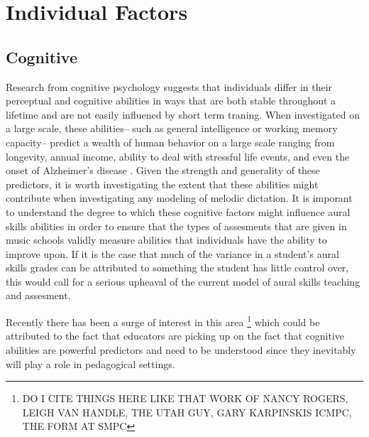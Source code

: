 \documentclass[]{book}
\let\rmarkdownfootnote\footnote%
\def\footnote{\protect\rmarkdownfootnote}
\theoremstyle{definition}
\theoremstyle{definition}
\theoremstyle{definition}
\theoremstyle{remark}
\begin{document}
\hypertarget{individual-factors}{%
\section{Individual Factors}\label{individual-factors}}

\hypertarget{cognitive}{%
\subsection{Cognitive}\label{cognitive}}

Research from cognitive psychology suggests that individuals differ in
their perceptual and cognitive abilities in ways that are both stable
throughout a lifetime and are not easily influened by short term
traning. When investigated on a large scale, these abilities-- such as
general intelligence or working memory capacity-- predict a wealth of
human behavior on a large scale ranging from longevity, annual income,
ability to deal with stressful life events, and even the onset of
Alzheimer's disease
\citep{ritchieIntelligenceAllThat2015, unsworthAutomatedVersionOperation2005}.
Given the strength and generality of these predictors, it is worth
investigating the extent that these abilities might contribute when
investigating any modeling of melodic dictation. It is imporant to
understand the degree to which these cognitive factors might influence
aural skills abilities in order to ensure that the types of assesments
that are given in music schools validly measure abilities that
individuals have the ability to improve upon. If it is the case that
much of the variance in a student's aural skills grades can be
attributed to something the student has little control over, this would
call for a serious upheaval of the current model of aural skills
teaching and assesment.

Recently there has been a surge of interest in this area \footnote{DO I
  CITE THINGS HERE LIKE THAT WORK OF NANCY ROGERS, LEIGH VAN HANDLE, THE
  UTAH GUY, GARY KARPINSKIS ICMPC, THE FORM AT SMPC} which could be
attributed to the fact that educators are picking up on the fact that
cognitive abilities are powerful predictors and need to be understood
since they inevitably will play a role in pedagogical settings.
\end{document}
